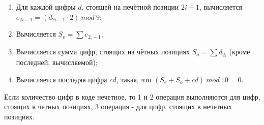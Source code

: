 \begin{enumerate}
\item Для каждой цифры $d$, стоящей на нечётной позиции $2i-1$, вычисляется
$e_{2i-1} = (d_{2i-1} \cdot 2)  \ mod \ 9$;
\item Вычисляется $S_e = \sum{e_{2_i - 1}}$;
\item Вычисляется сумма цифр, стоящих на чётных позициях $S_o = \sum{d_{2_i}}$ (кроме последней, вычисляемой);
\item Вычисляется последяя цифра $cd$, такая, что $(S_e + S_o + cd) \ mod \ 10 = 0$.

\end{enumerate}

Если количество цифр в коде нечетное, то 1 и 2 операция выполняются для цифр,
 стоящих в четных позициях, 3 операция \-- для цифр, стоящих в нечетных позициях.